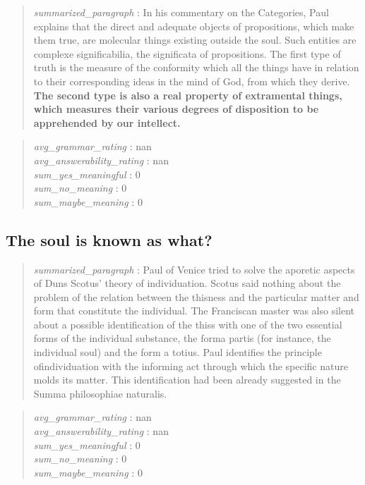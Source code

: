 \begin{quote}
\emph{summarized\_paragraph} : In his commentary on the Categories, Paul
explains that the direct and adequate objects of propositions, which
make them true, are molecular things existing outside the soul. Such
entities are complexe significabilia, the significata of propositions.
The first type of truth is the measure of the conformity which all the
things have in relation to their corresponding ideas in the mind of God,
from which they derive. \textbf{The second type is also a real property
of extramental things, which measures their various degrees of
disposition to be apprehended by our intellect.}
\end{quote}

\begin{quote}
\emph{avg\_grammar\_rating} : nan\\
\emph{avg\_answerability\_rating} : nan\\
\emph{sum\_yes\_meaningful} : 0\\
\emph{sum\_no\_meaning} : 0\\
\emph{sum\_maybe\_meaning} : 0
\end{quote}

\hypertarget{the-soul-is-known-as-what}{%
\subsection{The soul is known as
what?}\label{the-soul-is-known-as-what}}

\begin{quote}
\emph{summarized\_paragraph} : Paul of Venice tried to solve the
aporetic aspects of Duns Scotus' theory of individuation. Scotus said
nothing about the problem of the relation between the thisness and the
particular matter and form that constitute the individual. The
Franciscan master was also silent about a possible identification of the
thiss with one of the two essential forms of the individual substance,
the forma partis (for instance, the individual soul) and the form a
totius. Paul identifies the principle ofindividuation with the informing
act through which the specific nature molds its matter. This
identification had been already suggested in the Summa philosophiae
naturalis.
\end{quote}

\begin{quote}
\emph{avg\_grammar\_rating} : nan\\
\emph{avg\_answerability\_rating} : nan\\
\emph{sum\_yes\_meaningful} : 0\\
\emph{sum\_no\_meaning} : 0\\
\emph{sum\_maybe\_meaning} : 0
\end{quote}
